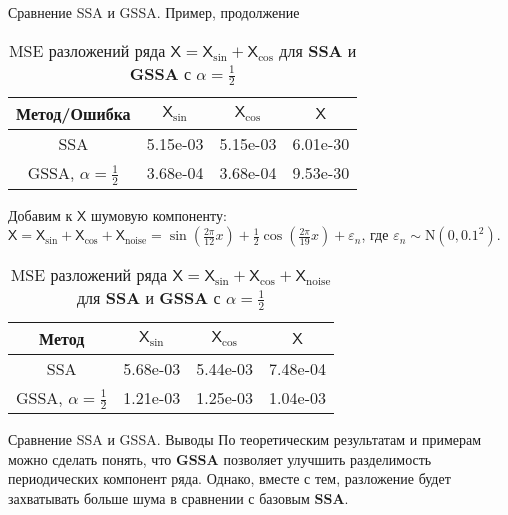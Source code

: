 \documentclass[notheorems, handout]{beamer}
\newcommand{\SSA}{\textbf{SSA}}
\newcommand{\GSSA}{\textbf{GSSA}}
\newcommand{\TS}{\mathsf{X}}
\begin{document}
	
	\begin{frame}{Сравнение SSA и GSSA. Пример, продолжение}
		\begin{table}[H]
			\centering
			\begin{tabular}{c|ccc}
				\hline
				Метод/Ошибка & $\TS_{\sin}$ & $\TS_{\cos}$ & $\TS$ \\ 
				\hline
				SSA   & 5.15e-03 & 5.15e-03 & 6.01e-30\\ 
				GSSA, $\alpha = \frac{1}{2}$  & 3.68e-04 & 3.68e-04 & 9.53e-30 \\ 
				\hline
			\end{tabular}
			\caption{MSE разложений ряда $\TS = \TS_{\sin} + \TS_{\cos}$ для $\SSA$ и $\GSSA$ с $\alpha = \frac{1}{2}$}
			\label{tab:mse_ssa_gssa}
		\end{table}
		Добавим к $\TS$ шумовую компоненту: $\TS = \TS_{\sin} + \TS_{\cos} + \TS_{\mathrm{noise}} =
		\sin\left(\frac{2\pi}{12}x\right) +
		\frac{1}{2}\cos\left(\frac{2\pi}{19}x\right)+
		\varepsilon_n$, 
		где $\varepsilon_n \sim \mathrm N(0, 0.1^2)$.
		\begin{table}[H]
			\centering
			\begin{tabular}{c|ccc}
				\hline
				Метод & $\TS_{\sin}$ & $\TS_{\cos}$ & $\TS$ \\ 
				\hline
				SSA      & 5.68e-03 & 5.44e-03 & 7.48e-04  \\ 
				GSSA, $\alpha = \frac{1}{2}$ & 1.21e-03 & 1.25e-03 & 1.04e-03 \\
				\hline
			\end{tabular}
			\caption{MSE разложений ряда $\TS = \TS_{\sin} + \TS_{\cos} + \TS_{\mathrm{noise}}$ для $\SSA$ и $\GSSA$ с $\alpha = \frac{1}{2}$}
			\label{tab:errs_ssa_gssa}
		\end{table}
	\end{frame}
	
	
	
	\begin{frame}{Сравнение SSA и GSSA. Выводы}
		По теоретическим результатам и примерам можно сделать понять, что $\GSSA$ позволяет улучшить разделимость периодических компонент ряда. Однако, вместе с тем, разложение будет захватывать больше шума в сравнении с базовым $\SSA$.
	\end{frame}
	
\end{document}
